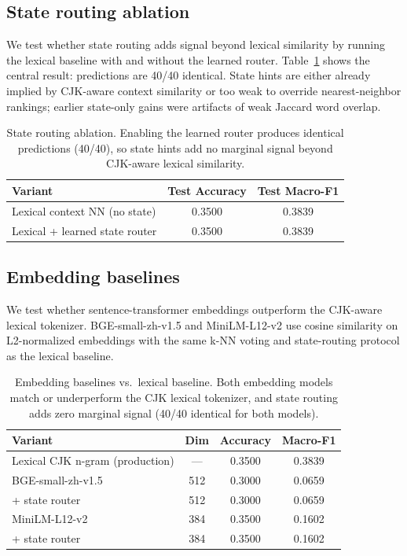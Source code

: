 \subsection{State routing ablation}

We test whether state routing adds signal beyond lexical similarity by running the lexical baseline with and without the learned router. Table~\ref{tab:state_ablation} shows the central result: predictions are 40/40 identical. State hints are either already implied by CJK-aware context similarity or too weak to override nearest-neighbor rankings; earlier state-only gains were artifacts of weak Jaccard word overlap.

\begin{table}[tbp]
\centering
\begin{tabular}{lcc}
\toprule
Variant & Test Accuracy & Test Macro-F1 \\
\midrule
Lexical context NN (no state) & 0.3500 & 0.3839 \\
Lexical + learned state router & 0.3500 & 0.3839 \\
\bottomrule
\end{tabular}
\caption{State routing ablation. Enabling the learned router produces identical predictions (40/40), so state hints add no marginal signal beyond CJK-aware lexical similarity.}
\label{tab:state_ablation}
\end{table}

\subsection{Embedding baselines}

We test whether sentence-transformer embeddings outperform the CJK-aware lexical tokenizer. BGE-small-zh-v1.5 and MiniLM-L12-v2 use cosine similarity on L2-normalized embeddings with the same k-NN voting and state-routing protocol as the lexical baseline.

\begin{table}[tbp]
\centering
\begin{tabular}{lccc}
\toprule
Variant & Dim & Accuracy & Macro-F1 \\
\midrule
Lexical CJK n-gram (production) & — & 0.3500 & 0.3839 \\
\midrule
BGE-small-zh-v1.5 & 512 & 0.3000 & 0.0659 \\
\quad + state router & 512 & 0.3000 & 0.0659 \\
MiniLM-L12-v2 & 384 & 0.3500 & 0.1602 \\
\quad + state router & 384 & 0.3500 & 0.1602 \\
\bottomrule
\end{tabular}
\caption{Embedding baselines vs.\ lexical baseline. Both embedding models match or underperform the CJK lexical tokenizer, and state routing adds zero marginal signal (40/40 identical for both models).}
\label{tab:embedding}
\end{table}

